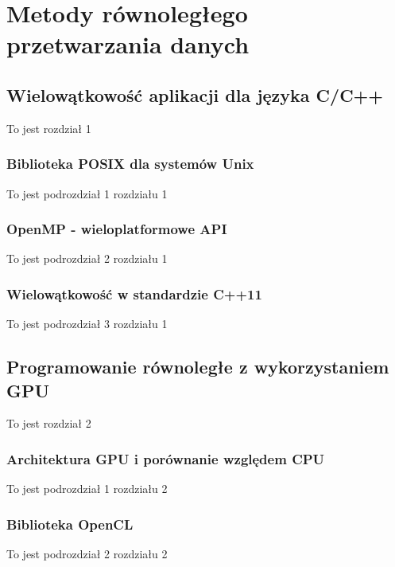 \documentclass[document.tex]{subfiles}
\begin{document}
\chapter{Metody równoległego przetwarzania danych}
\section{Wielowątkowość aplikacji dla języka C/C++}
To jest rozdział 1
	\subsection{Biblioteka POSIX dla systemów Unix}
	To jest podrozdział 1 rozdziału 1
	\subsection{OpenMP - wieloplatformowe API}
	To jest podrozdział 2 rozdziału 1
	\subsection{Wielowątkowość w standardzie C++11}
	To jest podrozdział 3 rozdziału 1
\section{Programowanie równoległe z wykorzystaniem GPU}
	To jest rozdział 2
	\subsection{Architektura GPU i porównanie względem CPU}
	To jest podrozdział 1 rozdziału 2
	\subsection{Biblioteka OpenCL}
	To jest podrozdział 2 rozdziału 2
\end{document}
